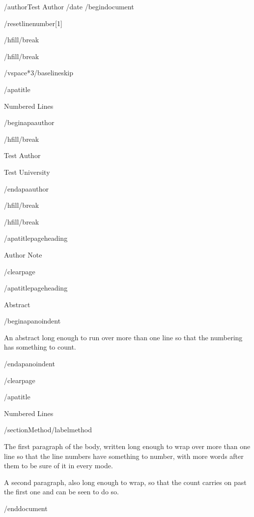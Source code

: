 /author{Test Author}
/date{}
/begin{document}


/resetlinenumber[1]

/hfill/break

/hfill/break

/vspace*{3/baselineskip}

/apatitle{

Numbered Lines

}

/begin{apaauthor}

/hfill/break

Test Author

Test University

/end{apaauthor}

/hfill/break

/hfill/break

/apatitlepageheading{

Author Note

}

/clearpage

/apatitlepageheading{

Abstract

}

/begin{apanoindent}

An abstract long enough to run over more than one line so that the
numbering has something to count.

/end{apanoindent}

/clearpage

/apatitle{

Numbered Lines

}

/section{Method}/label{method}

The first paragraph of the body, written long enough to wrap over more
than one line so that the line numbers have something to number, with
more words after them to be sure of it in every mode.

A second paragraph, also long enough to wrap, so that the count carries
on past the first one and can be seen to do so.




/end{document}
